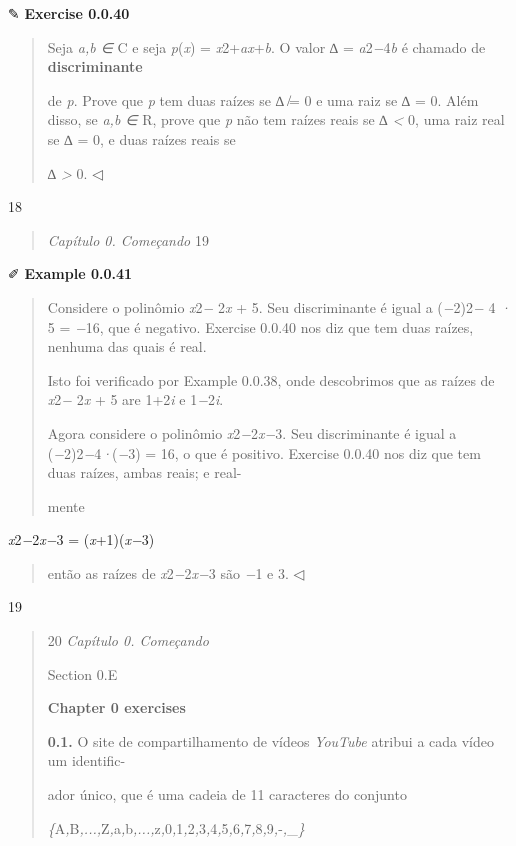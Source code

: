 \documentclass[
]{article}
\begin{document}
✎ \textbf{Exercise 0.0.40}

\begin{quote}
Seja \emph{a,b ∈} C e seja \emph{p}(\emph{x}) =
\emph{x}2+\emph{ax}+\emph{b}. O valor ∆ = \emph{a}2\emph{−}4\emph{b} é
chamado de \textbf{discriminante}

de \emph{p}. Prove que \emph{p} tem duas raízes se ∆ \emph{̸}= 0 e uma
raiz se ∆ = 0. Além disso, se \emph{a,b ∈} R, prove que \emph{p} não tem
raízes reais se ∆ \emph{\textless{}} 0, uma raiz real se ∆ = 0, e duas
raízes reais se

∆ \emph{\textgreater{}} 0. ◁
\end{quote}

18

\begin{quote}
\emph{Capítulo 0. Começando} 19
\end{quote}

✐ \textbf{Example 0.0.41}

\begin{quote}
Considere o polinômio \emph{x}2\emph{−} 2\emph{x} + 5. Seu discriminante
é igual a (\emph{−}2)2\emph{−} 4 \emph{·} 5 = \emph{−}16, que é
negativo. Exercise 0.0.40 nos diz que tem duas raízes, nenhuma das quais
é real.

Isto foi verificado por Example 0.0.38, onde descobrimos que as raízes
de \emph{x}2\emph{−} 2\emph{x} + 5 are 1+2\emph{i} e 1\emph{−}2\emph{i}.

Agora considere o polinômio \emph{x}2\emph{−}2\emph{x−}3. Seu
discriminante é igual a (\emph{−}2)2\emph{−}4\emph{·}(\emph{−}3) = 16, o
que é positivo. Exercise 0.0.40 nos diz que tem duas raízes, ambas
reais; e real-

mente
\end{quote}

\emph{x}2\emph{−}2\emph{x−}3 = (\emph{x}+1)(\emph{x−}3)

\begin{quote}
então as raízes de \emph{x}2\emph{−}2\emph{x−}3 são \emph{−}1 e 3. ◁
\end{quote}

19

\begin{quote}
20 \emph{Capítulo 0. Começando}

Section 0.E

\textbf{Chapter 0 exercises}

\textbf{0.1.} O site de compartilhamento de vídeos \emph{YouTube}
atribui a cada vídeo um identific-

ador único, que é uma cadeia de 11 caracteres do conjunto

\emph{\{}A\emph{,}B\emph{,...,}Z\emph{,}a\emph{,}b\emph{,...,}z\emph{,}0\emph{,}1\emph{,}2\emph{,}3\emph{,}4\emph{,}5\emph{,}6\emph{,}7\emph{,}8\emph{,}9\emph{,}-\emph{,}\_\emph{\}}
\end{quote}
\end{document}
